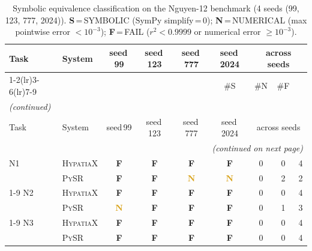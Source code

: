 \newcommand{\symT}{\textcolor{OliveGreen}{\bfseries S}}
\newcommand{\numT}{\textcolor{Goldenrod}{\bfseries N}}
\newcommand{\failT}{\textcolor{BrickRed}{\bfseries F}}

\begin{longtable}{llccccccc}
\caption{Symbolic equivalence classification on the Nguyen-12 benchmark
  (4 seeds (99, 123, 777, 2024)).
  \textbf{S}\,=\,SYMBOLIC (SymPy simplify\,=\,0);
  \textbf{N}\,=\,NUMERICAL (max pointwise error $<10^{-3}$);
  \textbf{F}\,=\,FAIL ($r^2 < 0.9999$ or numerical error $\ge 10^{-3}$).}
\label{tab:nguyen12_symequiv}\\
\toprule
\multicolumn{1}{l}{Task} & \multicolumn{1}{l}{System} & \multicolumn{1}{c}{\scriptsize seed\,99} & \multicolumn{1}{c}{\scriptsize seed\,123} & \multicolumn{1}{c}{\scriptsize seed\,777} & \multicolumn{1}{c}{\scriptsize seed\,2024} & \multicolumn{3}{c}{\scriptsize across seeds} \\
\cmidrule(lr){1-2}\cmidrule(lr){3-6}\cmidrule(lr){7-9}
 &  &  &  &  & {\scriptsize\#S} & {\scriptsize\#N} & {\scriptsize\#F} \\
\midrule
\endfirsthead
\multicolumn{9}{l}{\small\itshape (continued)} \\
\toprule
\multicolumn{1}{l}{Task} & \multicolumn{1}{l}{System} & \multicolumn{1}{c}{\scriptsize seed\,99} & \multicolumn{1}{c}{\scriptsize seed\,123} & \multicolumn{1}{c}{\scriptsize seed\,777} & \multicolumn{1}{c}{\scriptsize seed\,2024} & \multicolumn{3}{c}{\scriptsize across seeds} \\
\midrule
\endhead
\midrule
\multicolumn{9}{r}{\small\itshape (continued on next page)} \\
\endfoot
\bottomrule
\endlastfoot
N1 & \textsc{HypatiaX} & \failT & \failT & \failT & \failT & 0 & 0 & 4 \\
 & \textsc{PySR} & \failT & \failT & \numT & \numT & 0 & 2 & 2 \\
\cmidrule(lr){1-9}
N2 & \textsc{HypatiaX} & \failT & \failT & \failT & \failT & 0 & 0 & 4 \\
 & \textsc{PySR} & \numT & \failT & \failT & \failT & 0 & 1 & 3 \\
\cmidrule(lr){1-9}
N3 & \textsc{HypatiaX} & \failT & \failT & \failT & \failT & 0 & 0 & 4 \\
 & \textsc{PySR} & \failT & \failT & \failT & \failT & 0 & 0 & 4 \\

\end{longtable}

